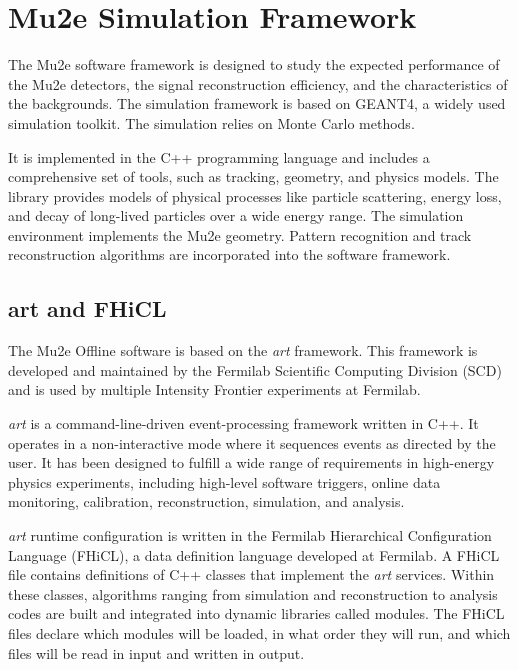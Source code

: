 
\chapter{Mu2e Simulation Framework}\label{mu2eana}

The Mu2e software framework is designed to study the expected performance of the Mu2e detectors, the signal 
reconstruction efficiency, and the characteristics of the backgrounds. The simulation framework is based on 
GEANT4, a widely used simulation toolkit. The simulation relies on Monte Carlo methods.

It is implemented in the C++ programming language and includes a comprehensive set of tools, such as 
tracking, geometry, and physics models. The library provides models of physical processes like particle 
scattering, energy loss, and decay of long-lived particles over a wide energy range. The simulation 
environment implements the Mu2e geometry. Pattern recognition and track reconstruction algorithms are 
incorporated into the software framework.

\section{art and FHiCL}

The Mu2e Offline software is based on the \textit{art} framework. 
This framework is developed and maintained by the Fermilab Scientific 
Computing Division (SCD) and is used by multiple Intensity Frontier experiments at Fermilab.

\textit{art} is a command-line-driven event-processing framework written in 
C++. It operates in a non-interactive mode where it sequences events as directed 
by the user. It has been designed to fulfill a wide range of requirements in 
high-energy physics experiments, including high-level software triggers, online data 
monitoring, calibration, reconstruction, simulation, and analysis.

\textit{art} runtime configuration is written in the Fermilab Hierarchical 
Configuration Language (FHiCL), a data definition language developed at Fermilab. 
A FHiCL file contains definitions of C++ classes that implement the \textit{art} 
services. Within these classes, algorithms ranging from simulation and 
reconstruction to analysis codes are built and integrated into dynamic 
libraries called modules. The FHiCL files declare which modules will be loaded, 
in what order they will run, and which files will be read in input and written in output.

